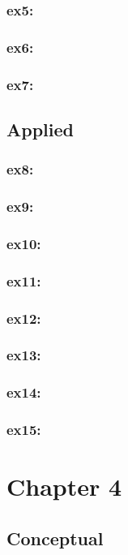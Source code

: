 \documentclass[a4paper,12pt,titlepage]{article} %
\begin{document}
\subsubsection{ex5:}
\subsubsection{ex6:}
\subsubsection{ex7:}

\subsection{Applied}
\subsubsection{ex8:}
\subsubsection{ex9:}
\subsubsection{ex10:}
\subsubsection{ex11:}
\subsubsection{ex12:}
\subsubsection{ex13:}
\subsubsection{ex14:}
\subsubsection{ex15:}

\newpage
\section{Chapter 4}
\subsection{Conceptual}
\end{document}
